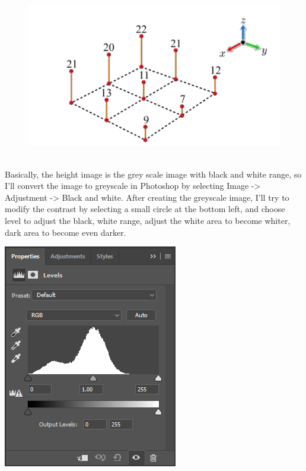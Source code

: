 \documentclass[a4paper, 13pt]{extarticle}
\begin{document}
\begin{figure}[h]
\begin{minipage}{.3\textwidth}
	 		\end{minipage}
 		\begin{minipage}{.3\textwidth}
 			\centering
 			\includegraphics[width=1.4\linewidth]{intructions/height_example.png}
 		\end{minipage}
 	\end{figure} 
 \\[0.02cm]
 Basically, the height image is the grey scale image with black and white range, so I'll convert the image to greyscale in Photoshop by selecting Image -> Adjustment -> Black and white. After creating the greyscale image, I'll try to modify the contrast by selecting a small circle at the bottom left, and choose level to adjust the black, white range, adjust the white area to become whiter, dark area to become even darker.
 \\[0.01cm]
 \noindent \begin{minipage}{0.21\textwidth}
 \includegraphics[width=\linewidth]{intructions/contrastAdjusting.png}
 \end{minipage}
\end{document}
